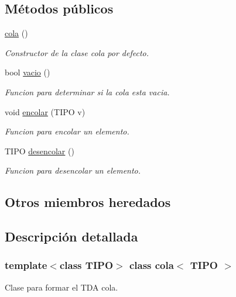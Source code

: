 \subsection*{Métodos públicos}
\begin{DoxyCompactItemize}
\item 
\mbox{\label{classcola_acf21bbf0b0795607993d5ffe736398ae}} 
\hyperlink{classcola_acf21bbf0b0795607993d5ffe736398ae}{cola} ()
\begin{DoxyCompactList}\small\item\em Constructor de la clase cola por defecto. \end{DoxyCompactList}\item 
bool \hyperlink{classcola_a2af9a71dd856a907f446a1e396d83e5b}{vacio} ()
\begin{DoxyCompactList}\small\item\em Funcion para determinar si la cola esta vacia. \end{DoxyCompactList}\item 
void \hyperlink{classcola_a4fe29cbff3478979d38a0f8a2d7a4b51}{encolar} (T\+I\+PO v)
\begin{DoxyCompactList}\small\item\em Funcion para encolar un elemento. \end{DoxyCompactList}\item 
T\+I\+PO \hyperlink{classcola_afbe13fa4237aa2fde61067900ff8f884}{desencolar} ()
\begin{DoxyCompactList}\small\item\em Funcion para desencolar un elemento. \end{DoxyCompactList}\end{DoxyCompactItemize}
\subsection*{Otros miembros heredados}


\subsection{Descripción detallada}
\subsubsection*{template$<$class T\+I\+PO$>$\newline
class cola$<$ T\+I\+P\+O $>$}

Clase para formar el T\+DA cola. 

